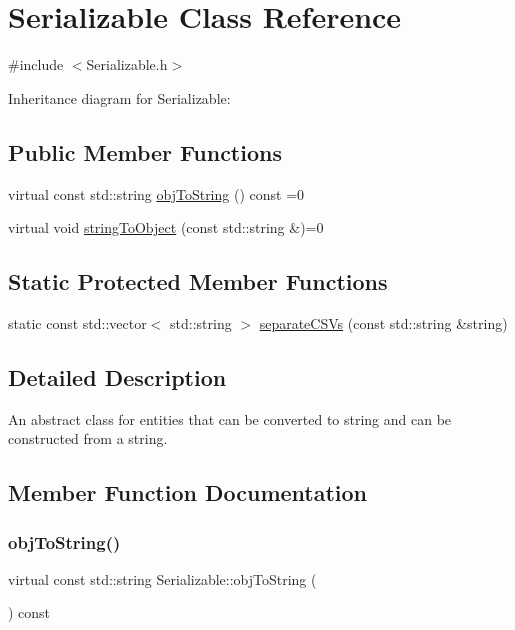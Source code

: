 \hypertarget{classSerializable}{}\section{Serializable Class Reference}
\label{classSerializable}


{\ttfamily \#include $<$Serializable.\+h$>$}



Inheritance diagram for Serializable\+:
\subsection*{Public Member Functions}
\begin{DoxyCompactItemize}
\item 
virtual const std\+::string \hyperlink{classSerializable_ab9cd1db8311603ce4250478c3dd3eb81}{obj\+To\+String} () const =0
\item 
virtual void \hyperlink{classSerializable_abaec34cf73821a3234cf4daea584eab3}{string\+To\+Object} (const std\+::string \&)=0
\end{DoxyCompactItemize}
\subsection*{Static Protected Member Functions}
\begin{DoxyCompactItemize}
\item 
static const std\+::vector$<$ std\+::string $>$ \hyperlink{classSerializable_acc2acbf868ec689695498fbb5c863cdb}{separate\+C\+S\+Vs} (const std\+::string \&string)
\end{DoxyCompactItemize}


\subsection{Detailed Description}
An abstract class for entities that can be converted to string and can be constructed from a string. 

\subsection{Member Function Documentation}
\mbox{\label{classSerializable_ab9cd1db8311603ce4250478c3dd3eb81}} 
\subsubsection{\texorpdfstring{obj\+To\+String()}{objToString()}}
{\footnotesize\ttfamily virtual const std\+::string Serializable\+::obj\+To\+String (\begin{DoxyParamCaption}{ }\end{DoxyParamCaption}) const\hspace{0.3cm}{\ttfamily [pure virtual]}}

